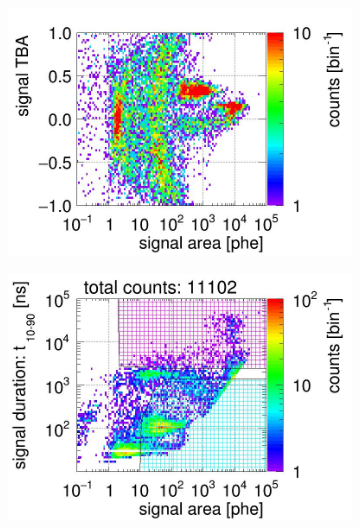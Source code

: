 \begin{landscape}
\begin{figure}[!p]
\begin{subfigure}[t]{0.33\textwidth}
			\includegraphics[width=\figurewidth,clip,trim={0 0 0 40}]{Figures/GasTest/CutsValid/res64767/tbapaX23Vecfig64767.jpg}
			\caption{}
			\label{fig:signal selection dv 12 02}
		\end{subfigure}
		\begin{subfigure}[t]{0.33\textwidth}
			\centering
			\includegraphics[width=\figurewidth,clip,trim={0 98 0 0}]{Figures/GasTest/CutsValid/res64767/pdpa26Vecfig64767.jpg}

\end{subfigure}
\end{figure}
\end{landscape}
